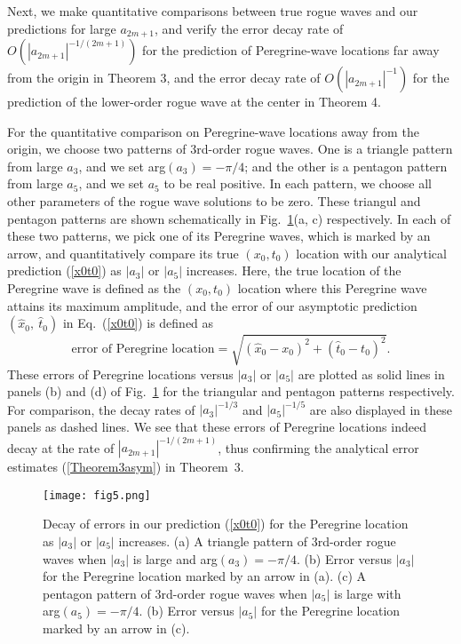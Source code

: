 \documentclass[amsmath,amssymb]{revtex4}
\begin{document}
Next, we make quantitative comparisons between true rogue waves and our predictions for large $a_{2m+1}$, and verify the error decay rate of $O(|a_{2m+1}|^{-1/(2m+1)})$ for the prediction of Peregrine-wave locations far away from the origin in Theorem 3, and the error decay rate of $O(|a_{2m+1}|^{-1})$ for the prediction of the lower-order rogue wave at the center in Theorem 4.

For the quantitative comparison on Peregrine-wave locations away from the origin, we choose two patterns of 3rd-order rogue waves. One is a triangle pattern from large $a_3$, and we set arg$(a_3)=-\pi /4$; and the other is a pentagon pattern from large $a_5$, and we set $a_5$ to be real positive. In each pattern, we choose all other parameters of the rogue wave solutions to be zero. These triangul and pentagon patterns are shown schematically in Fig.~\ref{f:comPere}(a, c) respectively. In each of these two patterns, we pick one of its Peregrine waves, which is marked by an arrow, and quantitatively compare its true $(x_0, t_0)$ location with our analytical prediction (\ref{x0t0}) as $|a_3|$ or $|a_5|$ increases. Here, the true location of the Peregrine wave is defined as the $(x_0, t_0)$ location where this Peregrine wave attains its maximum amplitude, and the error of our asymptotic prediction $(\hat{x}_{0},\ \hat{t}_{0})$ in Eq.~(\ref{x0t0}) is defined as
\begin{equation*}
\mbox{error of Peregrine location} = \sqrt{\left(\hat{x}_{0}-x_{0} \right)^2+\left(\hat{t}_{0}-t_{0}\right)^2}.
\end{equation*}
These errors of Peregrine locations versus $|a_3|$ or $|a_5|$ are plotted as solid lines in panels (b) and (d) of Fig.~\ref{f:comPere} for the triangular and pentagon patterns respectively. For comparison, the decay rates of $|a_{3}|^{-1/3}$ and $|a_{5}|^{-1/5}$ are also displayed in these panels as dashed lines. We see that these errors of Peregrine locations indeed decay at the rate of $|a_{2m+1}|^{-1/(2m+1)}$, thus confirming the analytical error estimates (\ref{Theorem3asym}) in Theorem~3.

\begin{figure}[htb]
\begin{center}
\texttt{[image: fig5.png]}
\caption{Decay of errors in our prediction (\ref{x0t0}) for the Peregrine location as $|a_3|$ or $|a_5|$ increases. (a) A triangle pattern of 3rd-order rogue waves when $|a_{3}|$ is large and arg$(a_3)=-\pi /4$. (b) Error versus $|a_3|$ for the Peregrine location marked by an arrow in (a).
(c) A pentagon pattern of 3rd-order rogue waves when $|a_5|$ is large with arg$(a_5)=-\pi /4$. (b) Error versus $|a_5|$ for the Peregrine location marked by an arrow in (c).}   \label{f:comPere}
\end{center}
\end{figure}
\end{document}
